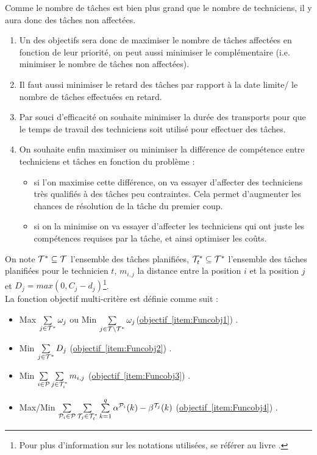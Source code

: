 
Comme le nombre de tâches est bien plus grand que le nombre de techniciens, il y aura donc des tâches non affectées.
\begin{enumerate}
\item \label{item:Funcobj1} Un des objectifs sera donc de maximiser le nombre de tâches affectées en fonction de leur priorité, on peut aussi minimiser le complémentaire (i.e. minimiser le nombre de tâches non affectées).
\item  \label{item:Funcobj2} Il faut aussi minimiser le retard des tâches par rapport à la date limite/ le nombre de tâches effectuées en retard.



\item  \label{item:Funcobj3} Par souci d'efficacité on souhaite minimiser la durée des transports pour que le temps de travail des techniciens soit utilisé pour effectuer des tâches.
\item \label{item:Funcobj4}On souhaite enfin maximiser ou minimiser la différence de compétence entre techniciens et tâches en fonction du problème : 
\begin{itemize}
\item si l'on maximise cette différence, on va essayer d'affecter des techniciens très qualifiés à des tâches peu contraintes. Cela permet d'augmenter les chances de résolution de la tâche du premier coup.
\item si on la minimise on va essayer d'affecter les techniciens qui ont juste les compétences requises par la tâche, et ainsi optimiser les coûts.
\end{itemize}
\end{enumerate}


\indent On note $\mathcal{T}^* \subseteq \mathcal{T}$ l'ensemble des tâches planifiées, $\mathcal{T}_t^* \subseteq \mathcal{T}^*$ l'ensemble des tâches planifiées pour le technicien $t$, $m_{i,j}$ la distance entre la position $i$ et la position $j$ et $D_j = max(0,C_j-d_j)$\footnote{Pour plus d'information sur les notations utilisées, se référer au livre \cite{blazewicz2007handbook}.}.
\\


La fonction objectif multi-critère est définie comme suit :

\begin{itemize}
\item Max $\sum\limits_{j \in \mathcal{T}^*} \omega_{j}$ ou Min $\sum\limits_{j \in \mathcal{T} \backslash \mathcal{T}^*} \omega_{j}$(\hyperref[item:Funcobj1]{objectif~\ref*{item:Funcobj1}}) .
\\
\item Min $\sum\limits_{j \in \mathcal{T}^*} D_j$ (\hyperref[item:Funcobj2]{objectif~\ref*{item:Funcobj2}}) .
\\
\item Min $\sum\limits_{i \in \mathcal{P}}\sum\limits_{j \in \mathcal{T}_i^*} m_{i,j}$ (\hyperref[item:Funcobj3]{objectif~\ref*{item:Funcobj3}}) .
\\
\item Max/Min $\sum\limits_{{\mathcal{P}_i} \in \mathcal{P}}\sum\limits_{{\mathcal{T}_j} \in \mathcal{T}_t^*}\sum\limits_{k=1}^q  \alpha^{\mathcal{P}_i}(k)-\beta^{\mathcal{T}_j}(k) $ (\hyperref[item:Funcobj4]{objectif~\ref*{item:Funcobj4}}) .
\end{itemize}


